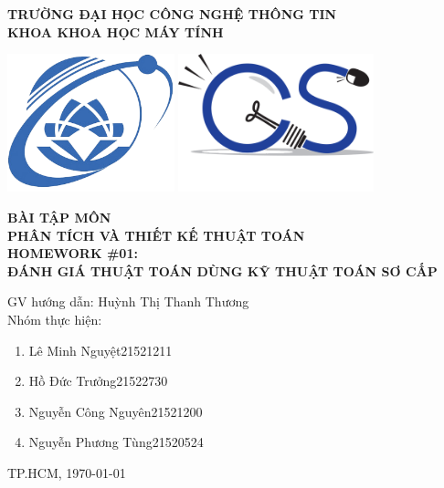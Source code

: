 \documentclass[12pt]{report}
\begin{document}
    \begin{titlepage}
        \begin{center}
            \textbf{\large TRƯỜNG ĐẠI HỌC CÔNG NGHỆ THÔNG TIN \\KHOA KHOA HỌC MÁY TÍNH\\}
        
            \vspace{1cm}
            
            \includegraphics[height=4cm]{./images/logo-uit.png}
            \hspace{1cm}
            \includegraphics[height=4cm]{./images/LogoCS.png}
            
            \textbf{\huge BÀI TẬP MÔN\\PHÂN TÍCH VÀ THIẾT KẾ THUẬT TOÁN
            \vspace{1cm}
            \Large\\HOMEWORK \#01:\\ ĐÁNH GIÁ THUẬT TOÁN DÙNG KỸ THUẬT TOÁN SƠ CẤP}

            \vspace{1cm}
            
            \Large GV hướng dẫn: Huỳnh Thị Thanh Thương\\
            \vspace{1cm}
            Nhóm thực hiện:\\

            \begin{enumerate}
            \centering
            \item Lê Minh Nguyệt\hspace{2cm}21521211
            \item Hồ Đức Trưởng\hspace{2.3cm}21522730
            \item Nguyễn Công Nguyên\hspace{0.8cm}21521200
            \item Nguyễn Phương Tùng\hspace{0.8cm}21520524
            \end{enumerate}
            
            \vfill    
            TP.HCM, \today
        \end{center}
    \end{titlepage}
\end{document}
